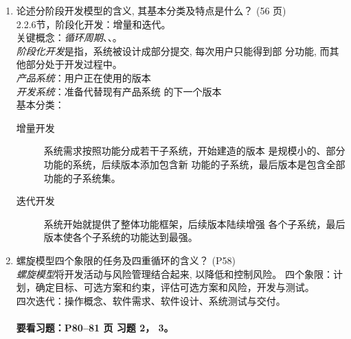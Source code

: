 \documentclass[14pt, letterpaper, UTF8, fontset=windowsnew, heading=true]{article}
\begin{document}
\begin{enumerate}
	\item 论述分阶段开发模型的含义, 其基本分类及特点是什么？ (56 页) \\
	2.2.6节，阶段化开发：增量和迭代。 \\
	关键概念：\emph{循环周期}、、。\\
	\emph{阶段化开发}是指，系统被设计成部分提交, 每次用户只能得到部
	分功能, 而其他部分处于开发过程中。\\
	\emph{产品系统}：用户正在使用的版本 \\
	\emph{开发系统}：准备代替现有产品系统
	的下一个版本 \\
	基本分类：
	\begin{description}
		\item[增量开发] 系统需求按照功能分成若干子系统，开始建造的版本
		是规模小的、部分功能的系统，后续版本添加包含新
		功能的子系统，最后版本是包含全部功能的子系统集。
		\item[迭代开发] 系统开始就提供了整体功能框架，后续版本陆续增强
		各个子系统，最后版本使各个子系统的功能达到最强。
	\end{description}
	
	\item 螺旋模型四个象限的任务及四重循环的含义？ (P58) \\
	\emph{螺旋模型}将开发活动与风险管理结合起来, 以降低和控制风险。
	四个象限：计划，确定目标、可选方案和约束，评估可选方案和风险，开发与测试。 \\
	四次迭代：操作概念、软件需求、软件设计、系统测试与交付。\\
	\\ \textbf{要看习题：P80--81 页 习题 2， 3。}
	


\end{enumerate}
\end{document}
